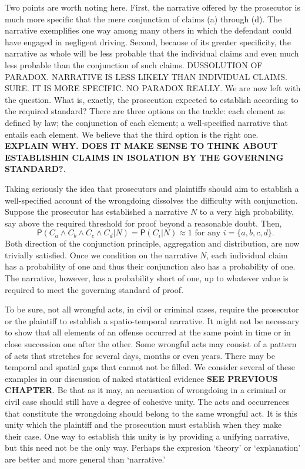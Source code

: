 \documentclass[
  10pt,
  dvipsnames,enabledeprecatedfontcommands]{scrartcl}
\newcommand{\pr}[1]{\mathsf{P}(#1)}
\begin{document}
Two points are worth noting here. First, the narrative offered by the
prosecutor is much more specific that the mere conjunction of claims (a)
through (d). The narrative exemplifies one way among many others in
which the defendant could have engaged in negligent driving. Second,
because of its greater specificity, the narrative as whole will be less
probable that the individual claims and even much less probable than the
conjunction of such claims. DUSSOLUTION OF PARADOX. NARRATIVE IS LESS
LIKELY THAN INDIVIDUAL CLAIMS. SURE. IT IS MORE SPECIFIC. NO PARADOX
REALLY. We are now left with the question. What is, exactly, the
prosecution expected to establish according to the required standard?
There are three options on the tackle: each element as defined by law;
the conjunction of each element; a well-specified narrative that entails
each element. We believe that the third option is the right one.
\textbf{EXPLAIN WHY. DOES IT MAKE SENSE TO THINK ABOUT ESTABLISHIN CLAIMS IN ISOLATION BY THE GOVERNING STANDARD?}.

Taking seriously the idea that prosecutors and plaintiffs should aim to
establish a well-specified account of the wrongdoing dissolves the
difficulty with conjunction. Suppose the prosecutor has established a
narrative \(N\) to a very high probability, say above the required
threshold for proof beyond a reasonable doubt.
Then,
\[\text{ $\pr{C_a\wedge C_b \wedge C_c\wedge C_d \vert N}=\pr{C_i \vert N}\approx 1$ for any $i=\{a, b, c, d\}$}.\]
\noindent Both direction of the conjunction principle, aggregation and
distribution, are now trivially satisfied. Once we condition on the
narrative \(N\), each individual claim has a probability of one and thus
their conjunction also has a probability of one. The narrative, however,
has a probability short of one, up to whatever value is required to meet
the governing standard of proof.

To be sure, not all wrongful acts, in civil or criminal cases, require
the prosecutor or the plaintiff to establish a spatio-temporal
narrative. It might not be necessary to show that all elements of an
offense occurred at the same point in time or in close succession one
after the other. Some wrongful acts may consist of a pattern of acts
that stretches for several days, months or even years. There may be
temporal and spatial gaps that cannot not be filled. We consider several
of these examples in our discussion of naked statistical evidence
\textbf{SEE PREVIOUS CHAPTER}. Be that as it may, an accusation of
wrongdoing in a criminal or civil case should still have a degree of
cohesive unity. The acts and occurrences that constitute the wrongdoing
should belong to the same wrongful act. It is this unity which the
plaintiff and the prosecution must establish when they make their case.
One way to establish this unity is by providing a unifying narrative,
but this need not be the only way. Perhaps the expresion `theory' or
`explanation' are better and more general than `narrative.'
\end{document}

